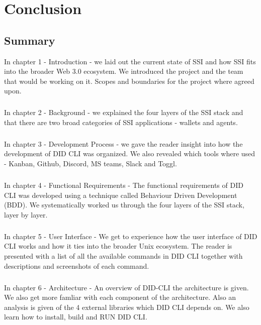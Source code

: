 \hypertarget{conclusion}{%
\chapter{Conclusion}\label{conclusion}}

\section{Summary}

In chapter 1 - Introduction - we laid out the current state of SSI and how SSI fits into the broader Web 3.0 ecosystem. We introduced the project and the team that would be working on it. Scopes and boundaries for the project where agreed upon.


\paragraph{}

In chapter 2 - Background - we explained the four layers of the SSI stack and that there are two broad categories of SSI applications - wallets and agents.


\paragraph{}
In chapter 3 - Development Process - we gave the reader insight into how the development of DID CLI was organized. We also revealed which tools where used - Kanban, Github, Discord, MS teams, Slack and Toggl.

  
\paragraph{}
In chapter 4 - Functional Requirements - The functional requirements of DID CLI was developed using a technique called Behaviour Driven Development (BDD). We systematically worked us through the four layers of the SSI stack, layer by layer.
  
  
\paragraph{}
In chapter 5 - User Interface - We get to experience how the user interface of DID CLI works and how it ties into the broader Unix ecosystem. The reader is presented with a list of all the available commands in DID CLI together with descriptions and screenshots of each command.


\paragraph{}
In chapter 6 - Architecture - An overview of DID-CLI the architecture is given. We also get more famliar with each component of the architecture. Also an analysis is given of the 4 external libraries which DID CLI depends on. We also learn how to install, build and RUN DID CLI. 


